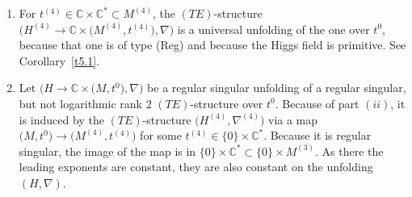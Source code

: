 \documentclass[10pt,a4paper]{amsart}
\numberwithin{equation}{section}
\numberwithin{figure}{section}
\newcommand{\N}{{\mathbb N}}
\newcommand{\C}{{\mathbb C}}
\renewcommand{\P}{{\mathbb P}}
\newcommand{\NN}{{\mathcal N}}
\newcommand{\www}{\widetilde}
\newcommand{\uuuu}{\underline}
\newcommand{\paa}{\partial}
\newcommand{\nnn}{\nabla}
\begin{document}
\begin{Remarks}
\begin{enumerate}
Then the matrices $A_2$ and $B$ with
$z\nnn_{\paa_i}\uuuu{v}^{(4)}=\uuuu{v}^{(4)}A_i$ and
$z^2\nnn_{\paa_z}\uuuu{v}^{(4)}=\uuuu{v}^{(4)}B$ are unchanged,
and $A_1=C_1$, so
\begin{gather*}%
A_1=C_1,\quad A_2=C_2\quad \text{(as in~\eqref{7.1})},\qquad
B\quad\text{is as in~\eqref{4.57} or~\eqref{4.59}}.
\end{gather*}
The Higgs field is everywhere on $M^{(4)}$ primitive.
By Theorem~\ref{t3.14},
$M^{(4)}=\C\times\P^1$ is an~$F$-manifold with Euler field.
The unit field is $\paa_1$, the multiplication is given
by $\paa_2\circ\paa_2=0$ and $\www\paa_2\circ\www\paa_2=0$.
So, each germ $\big(M^{(4)},t^0\big)$ is the germ $\NN_2$.
The Euler field is
\begin{gather*}
\begin{split}%
&E= t_1\paa_1 + (\alpha_1-\alpha_2)t_2\paa_2
=t_1\paa_1 + (\alpha_2-\alpha_1)\www t_2\www\paa_2
\\
&\qquad\begin{cases}
\text{in the case~\eqref{4.57} and~\eqref{4.58}
and in $(ii)$ above,}
\\
\text{and in the case~\eqref{4.59} and~\eqref{4.60}
 with }\alpha_1-\alpha_2\in\N,\end{cases}
 \\
&E= t_1\paa_1 -\paa_2
=t_1\paa_1 + \www t_2^2\www\paa_2\qquad
\text{in the case~\eqref{4.59} and~\eqref{4.60}
with }\alpha_1=\alpha_2.%
\end{split}
\end{gather*}

\item[$(ii)$] For $t^{(4)}\in \C\times\C^*\subset M^{(4)}$,
the $(TE)$-structure
$\big(H^{(4)}\to \C\times \big(M^{(4)},t^{(4)}\big),\nnn\big)$
is a universal unfolding of the one over $t^0$,
because that one is of type (Reg) and because the
Higgs field is primitive. See Corollary~\ref{t5.1}.

\item[$(iii)$] Let $\big(H\to\C\times \big(M,t^0\big),\nnn\big)$ be a regular
singular unfolding of a regular singular, but not
logarithmic rank $2$ $(TE)$-structure over $t^0$.
Because of part $(ii)$, it is induced by the
$(TE)$-structure $\big(H^{(4)},\nnn^{(4)}\big)$ via a map
$\big(M,t^0\big)\to \big(M^{(4)},t^{(4)}\big)$ for some
$t^{(4)}\in\{0\}\times \C^*$.
Because it is regular singular, the image of the map
is in $\{0\}\times \C^*\subset \{0\}\times M^{(3)}$.
As there the leading exponents are constant,
they are also constant on the unfolding $(H,\nnn)$.
\end{enumerate}
\end{Remarks}
\end{document}
